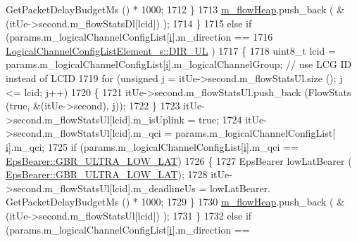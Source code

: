 \begin{DoxyCode}
      GetPacketDelayBudgetMs () * 1000;
1712                         \}
1713                         \hyperlink{classns3_1_1MmWaveFlexTtiMaxWeightMacScheduler_a5914fa5ecbe0fef6968a27a04df53e7b}{m\_flowHeap}.push\_back ( &(itUe->second.m\_flowStatsDl[lcid]) );
1714                 \}
1715                 \textcolor{keywordflow}{else} \textcolor{keywordflow}{if} (params.m\_logicalChannelConfigList[\hyperlink{bernuolliDistribution_8m_a6f6ccfcf58b31cb6412107d9d5281426}{i}].m\_direction ==
1716                                 \hyperlink{structns3_1_1LogicalChannelConfigListElement__s_a0ce1e3a6af4d9a3e9fc19361d0af4e00acc9eb2fd165cc693771639203d6212a9}{LogicalChannelConfigListElement\_s::DIR\_UL}
      )
1717                 \{
1718                 uint8\_t lcid = params.m\_logicalChannelConfigList[\hyperlink{bernuolliDistribution_8m_a6f6ccfcf58b31cb6412107d9d5281426}{i}].m\_logicalChannelGroup; \textcolor{comment}{// use LCG ID
       instead of LCID}
1719                 \textcolor{keywordflow}{for} (\textcolor{keywordtype}{unsigned} j = itUe->second.m\_flowStatsUl.size (); j <= lcid; j++)
1720                 \{
1721                         itUe->second.m\_flowStatsUl.push\_back (FlowStats (\textcolor{keyword}{true}, &(itUe->second), j));
1722                 \}
1723                         itUe->second.m\_flowStatsUl[lcid].m\_isUplink = \textcolor{keyword}{true};
1724                         itUe->second.m\_flowStatsUl[lcid].m\_qci = params.m\_logicalChannelConfigList[
      \hyperlink{bernuolliDistribution_8m_a6f6ccfcf58b31cb6412107d9d5281426}{i}].m\_qci;
1725                         \textcolor{keywordflow}{if} (params.m\_logicalChannelConfigList[\hyperlink{bernuolliDistribution_8m_a6f6ccfcf58b31cb6412107d9d5281426}{i}].m\_qci == 
      \hyperlink{structns3_1_1EpsBearer_aecf0c67109c5eb4ec0b07226fff5885ea1b3267491c7ea82ddc90b433c429c7c1}{EpsBearer::GBR\_ULTRA\_LOW\_LAT})
1726                         \{
1727                                 EpsBearer lowLatBearer (
      \hyperlink{structns3_1_1EpsBearer_aecf0c67109c5eb4ec0b07226fff5885ea1b3267491c7ea82ddc90b433c429c7c1}{EpsBearer::GBR\_ULTRA\_LOW\_LAT});
1728                                 itUe->second.m\_flowStatsUl[lcid].m\_deadlineUs = lowLatBearer.
      GetPacketDelayBudgetMs () * 1000;
1729                         \}
1730                         \hyperlink{classns3_1_1MmWaveFlexTtiMaxWeightMacScheduler_a5914fa5ecbe0fef6968a27a04df53e7b}{m\_flowHeap}.push\_back ( &(itUe->second.m\_flowStatsUl[lcid]) );
1731                 \}
1732                 \textcolor{keywordflow}{else} \textcolor{keywordflow}{if} (params.m\_logicalChannelConfigList[\hyperlink{bernuolliDistribution_8m_a6f6ccfcf58b31cb6412107d9d5281426}{i}].m\_direction ==

\end{DoxyCode}
